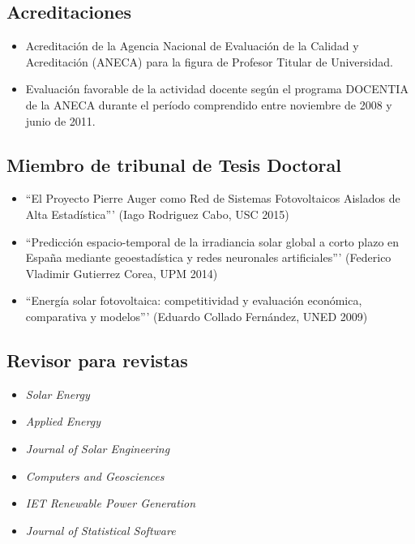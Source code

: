 \documentclass[article, a4paper]{memoir}
\begin{document}
\subsection{Acreditaciones}
\label{sec-15-1}

\begin{itemize}
\item Acreditación de la Agencia Nacional de Evaluación de la Calidad y Acreditación (ANECA) para la figura de Profesor Titular de Universidad.
\end{itemize}



\begin{itemize}
\item Evaluación favorable de la actividad docente según el programa DOCENTIA de la ANECA durante el período comprendido entre noviembre de 2008 y junio de 2011.
\end{itemize}

\subsection{Miembro de tribunal de Tesis Doctoral}
\label{sec-15-2}

\begin{itemize}
\item ``El Proyecto Pierre Auger como Red de Sistemas Fotovoltaicos Aislados de Alta Estadística''' (Iago Rodriguez Cabo, USC 2015)

\item ``Predicción espacio-temporal de la irradiancia solar global a corto plazo en España mediante geoestadística y redes neuronales artificiales''' (Federico Vladimir Gutierrez Corea, UPM 2014)

\item ``Energía solar fotovoltaica: competitividad y evaluación económica, comparativa y modelos''' (Eduardo Collado Fernández, UNED 2009)
\end{itemize}

\subsection{Revisor para revistas}
\label{sec-15-3}

\begin{itemize}
\item \emph{Solar Energy}

\item \emph{Applied Energy}

\item \emph{Journal of Solar Engineering}

\item \emph{Computers and Geosciences}

\item \emph{IET Renewable Power Generation}

\item \emph{Journal of Statistical Software}
\end{itemize}
\end{document}
